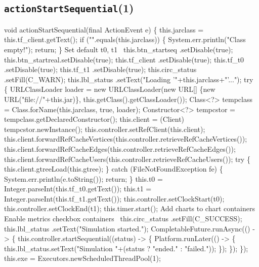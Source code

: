 \subsection{\texttt{actionStartSequential}(1)}
\nwenddocs{}\endmoddef{}
void actionStartSequential(final ActionEvent e) \{
  this.jarclass = this.tf_client.getText();
  if ("".equals(this.jarclass)) \{
    System.err.println("Class empty!");
    return;
  \}
  \LA{}Set default t0, t1~{\nwtagstyle{}}\RA{}
  this.btn_startseq .setDisable(true);
  this.btn_startreal.setDisable(true);
  this.tf_client     .setDisable(true);
  this.tf_t0        .setDisable(true);
  this.tf_t1        .setDisable(true);
  this.circ_status  .setFill(C_WARN);
  this.lbl_status   .setText("Loading '"+this.jarclass+"'...");
  try \{
    URLClassLoader loader = new URLClassLoader(new URL[] \{new URL("file://"+this.jar)\},
        this.getClass().getClassLoader());
    Class<?> tempclass = Class.forName(this.jarclass, true, loader);
    Constructor<?> tempcstor = tempclass.getDeclaredConstructor();
    this.client = (Client) tempcstor.newInstance();
    this.controller.setRefClient(this.client);
    this.client.forwardRefCacheVertices(this.controller.retrieveRefCacheVertices());
    this.client.forwardRefCacheEdges(this.controller.retrieveRefCacheEdges());
    this.client.forwardRefCacheUsers(this.controller.retrieveRefCacheUsers());
    try \{
      this.client.gtreeLoad(this.gtree);
    \} catch (FileNotFoundException fe) \{
      System.err.println(e.toString());
      return;
    \}
    this.t0 = Integer.parseInt(this.tf_t0.getText());
    this.t1 = Integer.parseInt(this.tf_t1.getText());
    this.controller.setClockStart(t0);
    this.controller.setClockEnd(t1);
    this.timer.start();
    \LA{}Add charts to chart containers~{\nwtagstyle{}}\RA{}
    \LA{}Enable metrics checkbox containers~{\nwtagstyle{}}\RA{}
    this.circ_status  .setFill(C_SUCCESS);
    this.lbl_status   .setText("Simulation started.");
    CompletableFuture.runAsync(() -> \{
      this.controller.startSequential((status) -> \{
        Platform.runLater(() -> \{
          this.lbl_status.setText("Simulation "+(status ? "ended." : "failed."));
        \});
      \});
    \});
    this.exe = Executors.newScheduledThreadPool(1);
